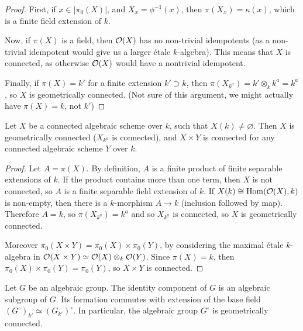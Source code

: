 \documentclass{memoir}
\begin{document}
\begin{proof}
	First, if $x \in |\pi_0(X)|$, and $X_x = \phi^{-1}(x)$, then
	$\pi(X_x) = \kappa(x)$, which is a finite field extension of $k$.
	
	Now, if $\pi(X)$ is a field, then $\mathcal{O}(X)$ has no non-trivial idempotents
	(as a non-trivial idempotent would give us a larger étale $k$-algebra).
	This means that $X$ is connected, as otherwise $\mathcal{O}(X)$ would have a
	nontrivial idempotent.
	
	Finally, if $\pi(X)=k'$ for a finite extension $k'\supset k$, then
	$\pi(X_{k^a}) = k' \otimes_k k^a = k^a$, so $X$ is geometrically
	connected. (Not sure of this argument, we might actually have
	$\pi(X) = k$, not $k'$)
\end{proof}

\begin{corollary}[1.32]
	Let $X$ be a connected algebraic scheme over $k$, such that
	$X(k)\ne \varnothing$. Then $X$ is geometrically connected ($X_{k^a}$ is
	connected), and
	$X \times Y$ is connected for any connected algebraic scheme $Y$ over $k$.
\end{corollary}

\begin{proof}
	Let $A=\pi(X)$. By definition, $A$ is a finite product of finite
	separable extensions of $k$. If the product contains more than one term,
	then $X$ is not connected, so $A$ is a finite separable field extension
	of $k$. If $X(k)\cong \operatorname{Hom}(\mathcal{O}(X),k)$ is non-empty, then there is
	a $k$-morphism $A \to k$ (inclusion followed by map). Therefore $A=k$,
	so $\pi(X_{k^a}) = k^a$ and so $X_{k^a}$ is connected, so $X$ is
	geometrically connected.
	
	Moreover $\pi_0(X\times Y) = \pi_0(X)\times \pi_0(Y)$, by considering
	the maximal étale $k$-algebra in
	$\mathcal{O}(X\times Y) \simeq \mathcal{O}(X)\otimes_k \mathcal{O}(Y)$. Since $\pi(X)=k$,
	then $\pi_0(X)\times \pi_0(Y) = \pi_0(Y)$, so $X\times Y$ is connected.
\end{proof}

\begin{proposition}[1.34]
	Let $G$ be an algebraic group. The identity component of $G$ is
	an algebraic subgroup of $G$. Its formation commutes with extension
	of the base field $(G^\circ)_{k'} \simeq (G_{k'})^\circ$. In particular,
	the algebraic group $G^\circ$ is geometrically connected.
	
\end{proposition}
\end{document}

